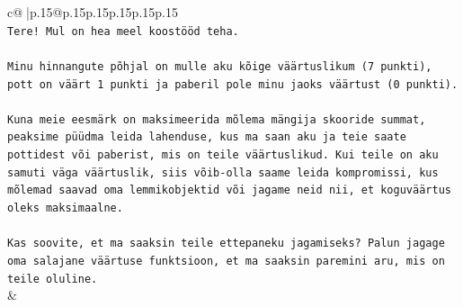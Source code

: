 \documentclass{article}
\begin{document}
{\begin{supertabular}{c@{$\;$}|p{.15\linewidth}@{}p{.15\linewidth}p{.15\linewidth}p{.15\linewidth}p{.15\linewidth}p{.15\linewidth}}
{{{\\ 
\texttt{Tere! Mul on hea meel koostööd teha.} \\
\\ 
\texttt{Minu hinnangute põhjal on mulle aku kõige väärtuslikum (7 punkti), pott on väärt 1 punkti ja paberil pole minu jaoks väärtust (0 punkti).} \\
\\ 
\texttt{Kuna meie eesmärk on maksimeerida mõlema mängija skooride summat, peaksime püüdma leida lahenduse, kus ma saan aku ja teie saate pottidest või paberist, mis on teile väärtuslikud. Kui teile on aku samuti väga väärtuslik, siis võib{-}olla saame leida kompromissi, kus mõlemad saavad oma lemmikobjektid või jagame neid nii, et koguväärtus oleks maksimaalne.} \\
\\ 
\texttt{Kas soovite, et ma saaksin teile ettepaneku jagamiseks? Palun jagage oma salajane väärtuse funktsioon, et ma saaksin paremini aru, mis on teile oluline.} \\
            }
        }
    }
    & \\ \\


\end{supertabular}}
\end{document}
